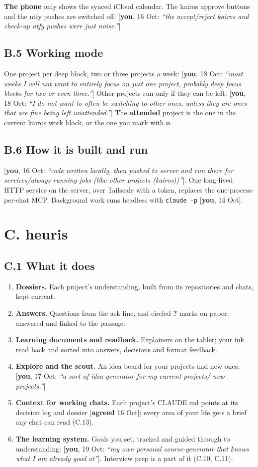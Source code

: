 \documentclass[10pt]{extarticle}
\newcommand{\you}[2]{{\small[\textbf{you}, #1: \textit{``#2''}]}}
\newcommand{\youx}[1]{{\small[\textbf{you}, #1]}}
\newcommand{\agreed}[1]{{\small[\textbf{agreed} #1]}}
\newcommand{\Sec}[1]{\section*{#1}\addcontentsline{toc}{section}{#1}}
\newcommand{\Sub}[1]{\subsection*{#1}}
\begin{document}
\textbf{The phone} only shows the synced iCloud calendar. The kairos approve buttons and the ntfy pushes are switched off: \you{16 Oct}{the accept/reject kairos and check-up ntfy pushes were just noise.}

\Sub{B.5 Working mode}
One project per deep block, two or three projects a week: \you{18 Oct}{most weeks I will not want to entirely focus on just one project, probably deep focus blocks for two or even three.} Other projects run only if they can be left: \you{18 Oct}{I do not want to often be switching to other ones, unless they are ones that are fine being left unattended.} The \textbf{attended} project is the one in the current kairos work block, or the one you mark with \texttt{m}.

\Sub{B.6 How it is built and run}
\you{16 Oct}{code written locally, then pushed to server and run there for services/always running jobs (like other projects (kairos))}. One long-lived HTTP service on the server, over Tailscale with a token, replaces the one-process-per-chat MCP. Background work runs headless with \texttt{claude -p} \youx{14 Oct}.

\clearpage
\Sec{C. heuris}

\Sub{C.1 What it does}
\begin{enumerate}
\item \textbf{Dossiers.} Each project's understanding, built from its repositories and chats, kept current.
\item \textbf{Answers.} Questions from the ask line, and circled \textbf{?} marks on paper, answered and linked to the passage.
\item \textbf{Learning documents and readback.} Explainers on the tablet; your ink read back and sorted into answers, decisions and format feedback.
\item \textbf{Explore and the scout.} An idea board for your projects and new ones: \you{17 Oct}{a sort of idea generator for my current projects/ new projects.}
\item \textbf{Context for working chats.} Each project's CLAUDE.md points at its decision log and dossier \agreed{16 Oct}; every area of your life gets a brief any chat can read (C.13).
\item \textbf{The learning system.} Goals you set, tracked and guided through to understanding: \you{19 Oct}{my own personal course-generator that knows what I am already good at}. Interview prep is a part of it (C.10, C.11).
\end{enumerate}
\end{document}
